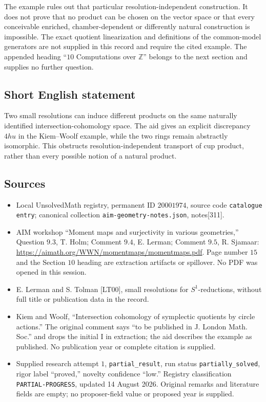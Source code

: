 \documentclass[11pt]{article}
\newcommand{\Z}{\mathbb{Z}}
\begin{document}
The example rules out that particular resolution-independent construction. It does not prove that no product can be chosen on the vector space or that every conceivable enriched, chamber-dependent or differently natural construction is impossible. The exact quotient linearization and definitions of the common-model generators are not supplied in this record and require the cited example. The appended heading ``\(10\) Computations over \(\Z\)'' belongs to the next section and supplies no further question.
\subsection{Short English statement}
Two small resolutions can induce different products on the same naturally identified intersection-cohomology space. The aid gives an explicit discrepancy \(4hu\) in the Kiem--Woolf example, while the two rings remain abstractly isomorphic. This obstructs resolution-independent transport of cup product, rather than every possible notion of a natural product.
\subsection{Sources}
\begin{itemize}
\item Local UnsolvedMath registry, permanent ID \(20001974\), source code \texttt{catalogue entry}; canonical collection \texttt{aim-geometry-notes.json}, notes[311].
\item AIM workshop ``Moment maps and surjectivity in various geometries,'' Question \(9.3\), T. Holm; Comment \(9.4\), E. Lerman; Comment \(9.5\), R. Sjamaar: \url{https://aimath.org/WWN/momentmaps/momentmaps.pdf}. Page number \(15\) and the Section \(10\) heading are extraction artifacts or spillover. No PDF was opened in this session.
\item E. Lerman and S. Tolman [LT00], small resolutions for \(S^1\)-reductions, without full title or publication data in the record.
\item Kiem and Woolf, ``Intersection cohomology of symplectic quotients by circle actions.'' The original comment says ``to be published in J. London Math. Soc.'' and drops the initial I in extraction; the aid describes the example as published. No publication year or complete citation is supplied.
\item Supplied research attempt \(1\), \texttt{partial\_result}, run status \texttt{partially\_solved}, rigor label ``proved,'' novelty confidence ``low.'' Registry classification \texttt{PARTIAL-PROGRESS}, updated 14 August 2026. Original remarks and literature fields are empty; no proposer-field value or proposed year is supplied.
\end{itemize}
\end{document}
